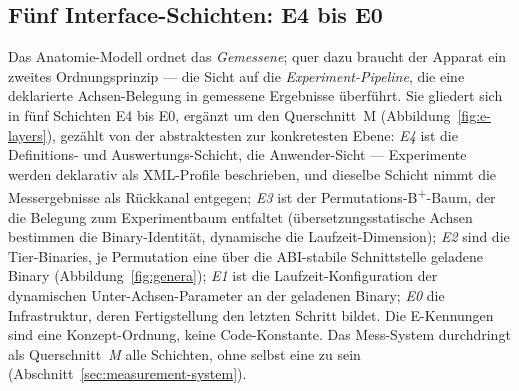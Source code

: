 \begin{nurkurz}
\subsection{Fünf Interface-Schichten: E4 bis E0}\label{sec:anatomy-layers}
Das Anatomie-Modell ordnet das \emph{Gemessene}; quer dazu braucht der Apparat ein zweites Ordnungsprinzip ---
die Sicht auf die \emph{Experiment-Pipeline}, die eine deklarierte Achsen-Belegung in gemessene Ergebnisse
überführt. Sie gliedert sich in fünf Schichten E4 bis E0, ergänzt um den Querschnitt~M
(Abbildung~\ref{fig:e-layers}), gezählt von der abstraktesten zur konkretesten Ebene: \emph{E4} ist die
Definitions- und Auswertungs-Schicht, die Anwender-Sicht --- Experimente werden deklarativ als XML-Profile
beschrieben, und dieselbe Schicht nimmt die Messergebnisse als Rückkanal entgegen; \emph{E3} ist der
Permutations-B\textsuperscript{+}-Baum, der die Belegung zum Experimentbaum entfaltet (übersetzungsstatische
Achsen bestimmen die Binary-Identität, dynamische die Laufzeit-Dimension); \emph{E2} sind die Tier-Binaries, je
Permutation eine über die ABI-stabile Schnittstelle geladene Binary (Abbildung~\ref{fig:genera}); \emph{E1} ist
die Laufzeit-Konfiguration der dynamischen Unter-Achsen-Parameter an der geladenen Binary; \emph{E0} die
Infrastruktur, deren Fertigstellung den letzten Schritt bildet. Die E-Kennungen sind eine Konzept-Ordnung, keine
Code-Konstante. Das Mess-System durchdringt als Querschnitt~\emph{M} alle Schichten, ohne selbst eine zu sein
(Abschnitt~\ref{sec:measurement-system}).
\end{nurkurz}

